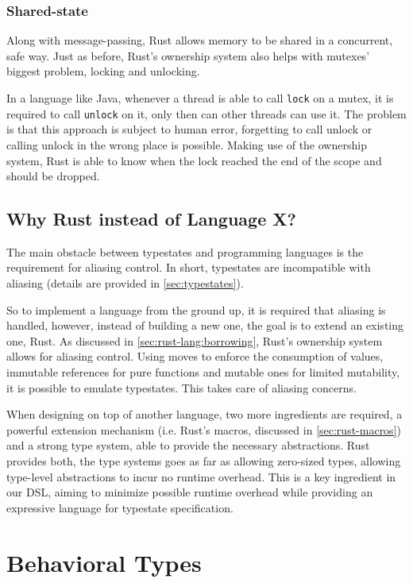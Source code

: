 \subsubsection*{Shared-state}

Along with message-passing, Rust allows memory to be shared in a concurrent, safe way.
Just as before, Rust's ownership system also helps with mutexes' biggest problem, locking and unlocking.

In a language like Java, whenever a thread is able to call \texttt{lock} on a mutex,
it is required to call \texttt{unlock} on it, only then can other threads can use it.
The problem is that this approach is subject to human error,
forgetting to call unlock or calling unlock in the wrong place is possible.
Making use of the ownership system, Rust is able to know when the lock reached the end of the scope and should be dropped.

\subsection{Why Rust instead of Language X?}

The main obstacle between typestates and programming languages is the requirement for aliasing control.
In short, typestates are incompatible with aliasing (details are provided in \autoref{sec:typestates}).

So to implement a language from the ground up, it is required that aliasing is handled,
however, instead of building a new one, the goal is to extend an existing one, Rust.
As discussed in \autoref{sec:rust-lang:borrowing}, Rust's ownership system allows for aliasing control.
Using moves to enforce the consumption of values,
immutable references for pure functions and mutable ones for limited mutability,
it is possible to emulate typestates. This takes care of aliasing concerns.

When designing on top of another language, two more ingredients are required,
a powerful extension mechanism (i.e. Rust's macros, discussed in \autoref{sec:rust-macros})
and a strong type system, able to provide the necessary abstractions.
Rust provides both, the type systems goes as far as allowing zero-sized types,
allowing type-level abstractions to incur no runtime overhead.
This is a key ingredient in our DSL, aiming to minimize possible runtime overhead while providing an expressive language for typestate specification.

\section{Behavioral Types}\label{sec:behavioral-types}

